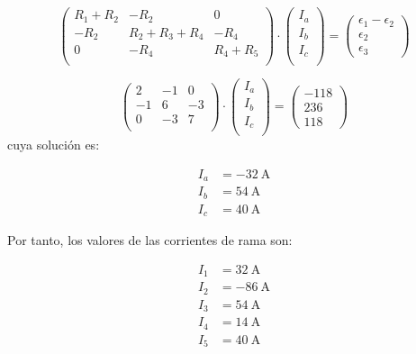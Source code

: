 \documentclass[10pt]{article}
\begin{document}
\[
  \left(\begin{array}{ccc}
          R_1 + R_2 & -R_2 & 0\\
          -R_2 & R_2 + R_3 + R_4 & - R_4\\
          0 & -R_4 & R_4 + R_5\\
        \end{array}\right)%
      \cdot \left(\begin{array}{c}
              I_a\\
              I_b\\
              I_c\\
            \end{array}\right)%
            = \left(\begin{array}{c}
              \epsilon_1 - \epsilon_2\\
              \epsilon_2\\
              \epsilon_3
            \end{array}\right)
\]

\[
  \left(\begin{array}{ccc}
          2 & -1 & 0 \\
          -1 & 6 & -3 \\
          0 & -3 & 7\\
        \end{array}\right)%
      \cdot \left(\begin{array}{c}
              I_a\\
              I_b\\
              I_c\\
            \end{array}\right)%
            = \left(\begin{array}{c}
              -118\\
              236\\
              118
            \end{array}\right)
\]
cuya solución es:

\begin{align*}
  I_a &= \SI{-32}{\ampere}\\
  I_b &= \SI{54}{\ampere}\\
  I_c &= \SI{40}{\ampere}
\end{align*}

Por tanto, los valores de las corrientes de rama son:

\begin{align*}
  I_1 &= \SI{32}{\ampere}\\
  I_2 &= \SI{-86}{\ampere}\\
  I_3 &= \SI{54}{\ampere}\\
  I_4 &= \SI{14}{\ampere}\\
  I_5 &= \SI{40}{\ampere}
\end{align*}
\end{document}
